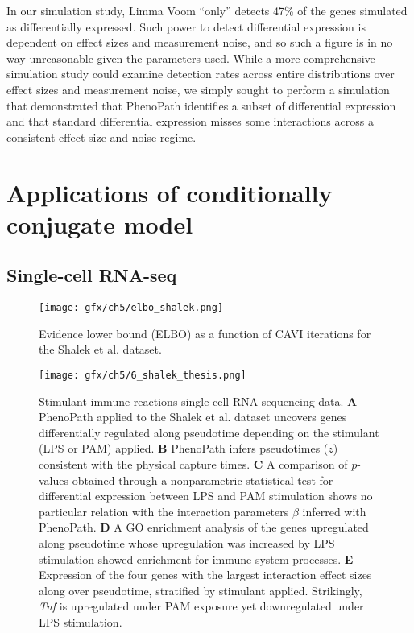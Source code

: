 In our simulation study, Limma Voom ``only'' detects 47\% of the genes simulated as differentially expressed. Such power to detect differential expression is dependent on effect sizes and measurement noise, and so such a figure is in no way unreasonable given the parameters used. While a more comprehensive simulation study could examine detection rates across entire distributions over effect sizes and measurement noise, we simply sought to perform a simulation that demonstrated that PhenoPath identifies a subset of differential expression and that standard differential expression misses some interactions across a consistent effect size and noise regime.




\section{Applications of conditionally conjugate model}

\subsection{Single-cell RNA-seq} \label{sec:shalek}

\begin{figure}
\centering
\texttt{[image: gfx/ch5/elbo\_shalek.png]}
\caption{Evidence lower bound (ELBO) as a function of CAVI iterations for the Shalek et al. dataset.}\label{fig:elbo_shalek}
\end{figure}

\begin{figure}
\centering
  \texttt{[image: gfx/ch5/6\_shalek\_thesis.png]}
  \caption{Stimulant-immune reactions single-cell RNA-sequencing data.
  \textbf{A} PhenoPath applied to the Shalek et al. dataset uncovers genes differentially regulated along pseudotime depending on the stimulant (LPS or PAM) applied.
  \textbf{B} PhenoPath infers pseudotimes ($z$) consistent with the physical capture times.
  \textbf{C} A comparison of $p$-values obtained through a nonparametric statistical test for differential expression between LPS and PAM stimulation shows no particular relation with the interaction parameters $\beta$ inferred with PhenoPath.
  \textbf{D} A GO enrichment analysis of the genes upregulated along pseudotime whose upregulation was increased by LPS stimulation showed enrichment for immune system processes.
  \textbf{E} Expression of the four genes with the largest interaction effect sizes along over pseudotime, stratified by stimulant applied. Strikingly, \emph{Tnf} is upregulated under PAM exposure yet downregulated under LPS stimulation.}  \label{fig:shalek}
\end{figure}

